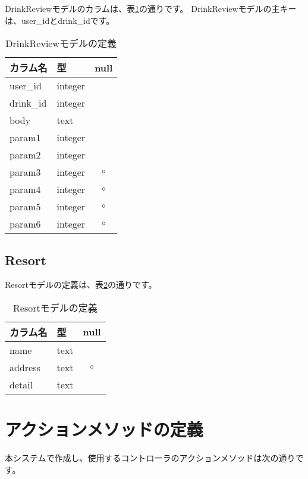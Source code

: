 \documentclass[a4j,titlepage]{jarticle}
\begin{document}
DrinkReviewモデルのカラムは、表\ref{drink_review}の通りです。
DrinkReviewモデルの主キーは、user\_idとdrink\_idです。

\begin{table}[!htbp]
\caption{DrinkReviewモデルの定義}
\label{drink_review}
\small
\begin{center}
\begin{tabular}{|l|l|c|}\hline
カラム名 & 型 & null \\\hline\hline
user\_id & integer & \\\hline
drink\_id & integer & \\\hline
body & text & \\\hline
param1 & integer & \\\hline
param2 & integer & \\\hline
param3 & integer & $\circ$ \\\hline
param4 & integer & $\circ$ \\\hline
param5 & integer & $\circ$ \\\hline
param6 & integer & $\circ$ \\\hline
\end{tabular}
\end{center}
\end{table}

\subsection{Resort}
Resortモデルの定義は、表\ref{resort}の通りです。

\begin{table}[!htbp]
\caption{Resortモデルの定義}
\label{resort}
\small
\begin{center}
\begin{tabular}{|l|l|c|}\hline
カラム名 & 型 & null \\\hline\hline
name & text & \\\hline
address & text & $\circ$ \\\hline
detail & text & \\\hline
\end{tabular}
\end{center}
\end{table}

\section{アクションメソッドの定義}
本システムで作成し、使用するコントローラのアクションメソッドは次の通りです。
\end{document}
